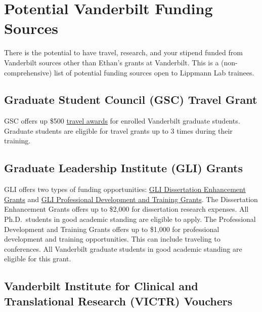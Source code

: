 \documentclass[
]{book}
\begin{document}
\hypertarget{potential-vanderbilt-funding-sources}{%
\section{Potential Vanderbilt Funding Sources}\label{potential-vanderbilt-funding-sources}}

There is the potential to have travel, research, and your stipend funded from Vanderbilt sources other than Ethan's grants at Vanderbilt. This is a (non-comprehensive) list of potential funding sources open to Lippmann Lab trainees.

\hypertarget{graduate-student-council-gsc-travel-grant}{%
\subsection{Graduate Student Council (GSC) Travel Grant}\label{graduate-student-council-gsc-travel-grant}}

GSC offers up \$500 \href{https://studentorg.vanderbilt.edu/gsc/travel-funding-request/}{travel awards} for enrolled Vanderbilt graduate students. Graduate students are eligible for travel grants up to 3 times during their training.

\hypertarget{graduate-leadership-institute-gli-grants}{%
\subsection{Graduate Leadership Institute (GLI) Grants}\label{graduate-leadership-institute-gli-grants}}

GLI offers two types of funding opportunities: \href{https://gradschool.vanderbilt.edu/gli/deg/}{GLI Dissertation Enhancement Grants} and \href{https://gradschool.vanderbilt.edu/gli/pdt/}{GLI Professional Development and Training Grants}. The Dissertation Enhancement Grants offers up to \$2,000 for dissertation research expenses. All Ph.D.~students in good academic standing are eligible to apply. The Professional Development and Training Grants offers up to \$1,000 for professional development and training opportunities. This can include traveling to conferences. All Vanderbilt graduate students in good academic standing are eligible for this grant.

\hypertarget{vanderbilt-institute-for-clinical-and-translational-research-victr-vouchers}{%
\subsection{Vanderbilt Institute for Clinical and Translational Research (VICTR) Vouchers}\label{vanderbilt-institute-for-clinical-and-translational-research-victr-vouchers}}
\end{document}
